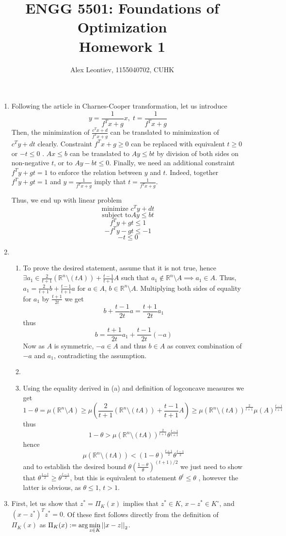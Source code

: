 \documentclass[8pt]{article} %
\title{ ENGG 5501: Foundations of Optimization\\Homework 1}
\author{Alex Leontiev, 1155040702, CUHK}
\begin{document}
\maketitle
\begin{enumerate}[label=\bfseries Problem \arabic*]
	\item{Following the article in Charnes-Cooper transformation, let us introduce 
		\[y=\frac{1}{f^Tx+g}x,\;t=\frac{1}{f^Tx+g}\]
		Then, the minimization of $\frac{c^Tx+d}{f^Tx+g}$ can be translated to minimization of $c^Ty+dt$ clearly. Constraint
		$f^Tx+g\geq 0$ can be replaced with equivalent $t\geq 0$ or $-t\leq 0$
		. $Ax\leq b$ can be translated to $Ay\leq bt$ by division of both sides
		on non-negative $t$, or to $Ay-bt\leq 0$. Finally, we need an additional constraint $f^Ty+gt=1$ to enforce the relation
		between $y$ and $t$. Indeed, together $f^Ty+gt=1$ and $y=\frac{1}{f^Tx+g}$ imply that $t=\frac{1}{f^Tx+g}$.

		Thus, we end up with linear problem
		\[\mbox{minimize }c^Ty+dt\]
		\[\mbox{subject to} Ay\leq bt\]
		\[f^Ty+gt\leq 1\]
		\[-f^Ty-gt\leq -1\]
		\[-t\leq 0\]
		}
	\item{\begin{enumerate}[label=(\alph*)]
			\item{To prove the desired statement, assume that it is not true, hence $\exists a_1\in \frac{2}{t+1}(\mathbb{R}^n\setminus
				(tA))+\frac{t-1}{t+1}A$ such that $a_1\notin\mathbb{R}^n\setminus A\implies a_1\in A$. Thus,
				$a_1=\frac{2}{t+1}b+\frac{t-1}{t+1}a$ for $a\in A$, $b\in\mathbb{R}^n\setminus A$. Multiplying both
				sides of equality for $a_1$ by $\frac{t+1}{2t}$ we get
				\[b+\frac{t-1}{2t}a=\frac{t+1}{2t}a_1\]
				thus
				\[b=\frac{t+1}{2t}a_1+\frac{t-1}{2t}(-a)\]
				Now as $A$ is symmetric, $-a\in A$ and thus $b\in A$ as convex combination of $-a$ and $a_1$, contradicting
				the assumption.
				}
			\item{}
			\item{Using the equality derived in (a) and definition of logconcave measures we get
				\[1-\theta=\mu(\mathbb{R}^n\setminus A)\geq \mu(\frac{2}{t+1}(\mathbb{R}^n\setminus
				(tA))+\frac{t-1}{t+1}A)\geq \mu(\mathbb{R}^n\setminus (tA))^{\frac{2}{t+1}}\mu(A)^{\frac{t-1}{t+1}}\]
				thus
				\[1-\theta>\mu(\mathbb{R}^n\setminus (tA))^{\frac{2}{t+1}}\theta^{\frac{t-1}{t+1}}\]
				hence
				\[\mu(\mathbb{R}^n\setminus (tA))<(1-\theta)^{\frac{t+1}{2}}\theta^{\frac{t-1}{2}}\]
				and to establish the desired bound $\theta\left(\frac{1-\theta}{\theta}\right)^{(t+1)/2}$ we just need to
				show that $\theta^{\frac{1-t}{2}}\geq \theta^{\frac{t-1}{2}}$, but this is equivalent to statement $\theta^t\leq\theta$
				, however the latter is obvious, as $\theta\leq 1$, $t> 1$.
				}
		\end{enumerate}}
	\item{First, let us show that $z^*=\Pi_K(x)$ implies that $z^*\in K$, $x-z^*\in K^\circ$, and $(x-z^*)^Tz^*=0$. Of these
		first follows directly from the definition of $\Pi_K(x)$ as $\Pi_K(x):=\arg\min_{z\in K}\mynorm{x-z}_2$. 
		
}
\end{enumerate}
\end{document}
